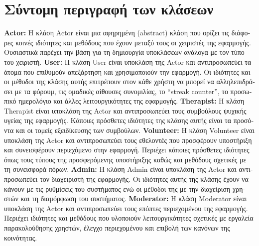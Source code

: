 \documentclass{article}
\begin{document}
\newpage
\section*{\textgreek{Σύντομη περιγραφή των κλάσεων}}
\textbf{Actor:} \textgreek{Η κλάση} Actor \textgreek{είναι μια αφηρημένη} (abstract) \textgreek{κλάση που ορίζει τις διάφορες κοινές ιδιότητες και μεθόδους που έχουν μεταξύ τους οι χειριστές της εφαρμογής. Ουσιαστικά παρέχει την βάση για τη δημιουργία υποκλάσεων ανάλογα με τον τύπο του χειριστή.}
\newline
\newline
\textbf{User:} \textgreek{Η κλάση} User \textgreek{είναι υποκλάση της} Actor \textgreek{και αντιπροσωπεύει τα άτομα που επιθυμούν απεξάρτηση και χρησιμοποιούν την εφαρμογή. Οι ιδιότητες και οι μέθοδοι της κλάσης αυτής επιτρέπουν στον κάθε χρήστη να μπορεί να αλληλεπιδράσει με τα φόρουμ, τις ομαδικές αίθουσες συνομιλίας, το} “streak counter”, \textgreek{το προσωπικό ημερολόγιο και άλλες λειτουργικότητες της εφαρμογής.}
\newline
\newline
\textbf{Therapist:} \textgreek{Η κλάση} Therapist \textgreek{είναι υποκλάση της} Actor \textgreek{και αντιπροσωπεύει τους συμβούλους ψυχικής υγείας της εφαρμογής. Κάποιες πρόσθετες ιδιότητες της κλάσης αυτής είναι τα προσόντα και οι τομείς εξειδίκευσης των συμβούλων.}
\newline
\newline
\textbf{Volunteer:} \textgreek{Η κλάση} Volunteer \textgreek{είναι υποκλάση της} Actor \textgreek{και αντιπροσωπεύει τους εθελοντές που προσφέρουν υποστήριξη και συνεισφέρουν περιεχόμενο στην εφαρμογή. Περιέχει κάποιες πρόσθετες ιδιότητες όπως τους τύπους της προσφερόμενης υποστήριξης καθώς και μεθόδους σχετικές με τη συνεισφορά πόρων.}
\newline
\newline
\textbf{Admin:} \textgreek{Η κλάση} Admin \textgreek{είναι υποκλάση της} Actor \textgreek{και αντιπροσωπεύει τον διαχειριστή της εφαρμογής. Οι ιδιότητες αυτής της κλάσης έχουν να κάνουν με τις ρυθμίσεις του συστήματος ενώ οι μέθοδοι της με την διαχείριση χρηστών και τη διαμόρφωση του συστήματος.}
\newline
\newline
\textbf{Moderator:} \textgreek{Η κλάση} Moderator \textgreek{είναι υποκλάση της} Actor \textgreek{και αντιπροσωπεύει τους επόπτες περιεχομένου της εφαρμογής. Περιέχει ιδιότητες και μεθόδους που υλοποιούν λειτουργικότητες σχετικές με εργαλεία παρακολούθησης χρηστών, έλεγχο περιεχομένου και επιβολή των κανόνων της κοινότητας.}
\end{document}
